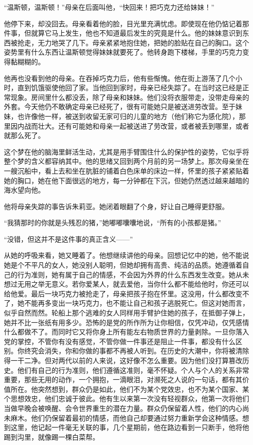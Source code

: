 ``温斯顿，温斯顿！''母亲在后面叫他，``快回来！把巧克力还给妹妹！''

他停下来，却没回去。母亲看着他的脸，目光里充满忧虑。即使现在他仍惦记着那件事，但就算它马上发生，他也不知道最后发生的究竟是什么。他的妹妹意识到东西被抢走，无力地哭了几下。母亲紧紧地抱住她，把她的脸贴在自己的胸口。这个姿势里有什么东西让温斯顿觉得妹妹就要死了。他转身跑下楼梯，手里的巧克力变得黏糊糊的。

他再也没看到他的母亲。在吞掉巧克力后，他有些惭愧。他在街上游荡了几个小时，直到饥饿驱使他回了家。当他回到家时，母亲已经失踪了。在当时这已经是正常现象。房间里什么都没丢，除了母亲和妹妹。他们没将衣服带走，没带走母亲的外套。今天他仍不敢确定母亲已经死了，很有可能她只是被送进劳改营。至于妹妹，也许像他一样，被送到收留无家可归的儿童的地方（他们称它为感化院），那里因内战而壮大。还有可能她和母亲一起被送进了劳改营，或者被丢到哪里，或者就那么死了。

这个梦在他的脑海里鲜活生动，尤其是用手臂围住什么的保护性的姿势，它似乎将整个梦的含义都容纳其中。他的思绪又回到两个月前的另一场梦上。那次母亲坐在一艘沉船中，看上去和坐在肮脏的铺着白色床单的床边一样，怀里的孩子紧紧贴着她的胸口，她在他下面很远的地方，每一分钟都在下沉，但她仍然透过越来越暗的海水望向他。

他将母亲失踪的事告诉朱莉亚。她闭着眼翻了个身，好让自己睡得更舒服。

``我猜那时的你就是头残忍的猪，''她嘟嘟囔囔地说，``所有的小孩都是猪。''

``没错，但这并不是这件事的真正含义——''

从她的呼吸来看，她又睡着了。他想继续讲他的母亲。回想记忆中的她，他不能说她是个不平凡的女人，她没别人聪明，但她却拥有高贵、纯洁的品质。她遵循着自己的行为准则，她有属于自己的情感，不会因为外界的什么东西发生改变。她从未想过无用之举无意义。若你爱某人，就去爱他，当你什么都不能给他时，你还可以给他爱。最后一块巧克力被抢走了，母亲把孩子抱在怀里。这没用，什么都改变不了，她不能再多变出一块巧克力，也不能让自己和孩子逃脱死亡。但这对她而言，似乎自然而然。轮船上那个逃难的女人同样用手臂护住她的孩子，在抵御子弹上，她并不比一张纸有用多少。恐怖的是党的所作所为让你相信，仅凭冲动，仅凭感情什么都做不了。而同时它又将你身上所有能左右物质世界的力量剥除。一旦你落入党的掌控，不管你有没有感觉，不管你做一件事还是阻止一件事，都没有什么区别。你终究会消失，你和你做的事都不再被人听到。在历史的大潮中，你将被清除得一干二净。但对两代以前的人来说，这好像不怎么重要。因为他们没打算篡改历史。他们有自己的行为准则，他们遵循这准则，毫不怀疑。个人与个人的关系非常重要，那些无用的动作，一个拥抱，一滴眼泪，对濒死之人说的一句话，都有其价值所在。他突然想到，群众仍是如此，他们不为某个党效忠，也不为某个国家、某个思想效忠，他们忠诚于彼此。他有生以来第一次没有轻视群众，他第一次将他们当做早晚会被唤醒、会令世界重生的潜在力量。群众仍保留着人性，他们的内心尚未麻木。他们仍保留着最初的情感，而他自己却要通过努力重新学会这种情感。想到这里，他记起一件毫无关联的事，几个星期前，他在路边看到一只断手，他将他踢到沟里，就像踢一棵白菜帮。

